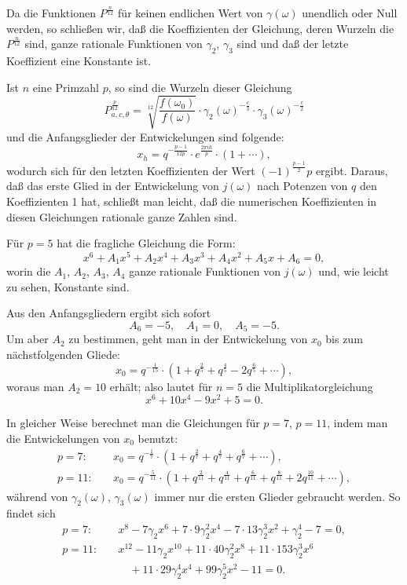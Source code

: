 \documentclass[12pt,a4paper]{article}
\theoremstyle{definition}
\begin{document}
Da die Funktionen $P^{\frac{n}{12}}$ für keinen endlichen Wert von $\gamma(\omega)$ unendlich oder Null werden, so schließen wir, daß die Koeffizienten der Gleichung, deren Wurzeln die $P^{\frac{n}{12}}$ sind, ganze rationale Funktionen von $\gamma_2$, $\gamma_3$ sind und daß der letzte Koeffizient eine Konstante ist.

Ist $n$ eine Primzahl $p$, so sind die Wurzeln dieser Gleichung
\[
P_{a,c,\theta}^{\frac{p}{12}} = \sqrt[12]{\frac{f(\omega_0)}{f(\omega)}} \cdot \gamma_2(\omega)^{-\frac{c}{3}} \cdot \gamma_3(\omega)^{-\frac{c}{2}}
\]
und die Anfangsglieder der Entwickelungen sind folgende:
\[
x_h = q^{-\frac{p-1}{12p}} \cdot e^{\frac{2\pi i h}{p}} \cdot (1 + \cdots),
\]
wodurch sich für den letzten Koeffizienten der Wert $(-1)^{\frac{p-1}{2}} p$ ergibt. Daraus, daß das erste Glied in der Entwickelung von $j(\omega)$ nach Potenzen von $q$ den Koeffizienten 1 hat, schließt man leicht, daß die numerischen Koeffizienten in diesen Gleichungen rationale ganze Zahlen sind.

Für $p = 5$ hat die fragliche Gleichung die Form:
\[
x^6 + A_1 x^5 + A_2 x^4 + A_3 x^3 + A_4 x^2 + A_5 x + A_6 = 0,
\]
worin die $A_1$, $A_2$, $A_3$, $A_4$ ganze rationale Funktionen von $j(\omega)$ und, wie leicht zu sehen, Konstante sind.

Aus den Anfangsgliedern ergibt sich sofort
\[
A_6 = -5, \quad A_1 = 0, \quad A_5 = -5.
\]
Um aber $A_2$ zu bestimmen, geht man in der Entwickelung von $x_0$ bis zum nächstfolgenden Gliede:
\[
x_0 = q^{-\frac{1}{15}} \cdot (1 + q^{\frac{2}{5}} + q^{\frac{4}{5}} - 2q^{\frac{6}{5}} + \cdots),
\]
woraus man $A_2 = 10$ erhält; also lautet für $n = 5$ die Multiplikatorgleichung
\begin{equation}\label{eq:72-8}
x^6 + 10x^4 - 9x^2 + 5 = 0.
\end{equation}

In gleicher Weise berechnet man die Gleichungen für $p = 7$, $p = 11$, indem man die Entwickelungen von $x_0$ benutzt:
\[
\begin{aligned}
p = 7:\quad &x_0 = q^{-\frac{1}{7}} \cdot (1 + q^{\frac{2}{7}} + q^{\frac{4}{7}} + q^{\frac{6}{7}} + \cdots), \\
p = 11:\quad &x_0 = q^{-\frac{5}{11}} \cdot (1 + q^{\frac{2}{11}} + q^{\frac{4}{11}} + q^{\frac{6}{11}} + q^{\frac{8}{11}} + 2q^{\frac{10}{11}} + \cdots),
\end{aligned}
\]
während von $\gamma_2(\omega)$, $\gamma_3(\omega)$ immer nur die ersten Glieder gebraucht werden. So findet sich
\begin{equation}\label{eq:72-9}
\begin{aligned}
p = 7:\quad &x^8 - 7\gamma_2 x^6 + 7 \cdot 9 \gamma_2^2 x^4 - 7 \cdot 13 \gamma_2^3 x^2 + \gamma_2^4 - 7 = 0, \\
p = 11:\quad &x^{12} - 11\gamma_2 x^{10} + 11 \cdot 40 \gamma_2^2 x^8 + 11 \cdot 153 \gamma_2^3 x^6 \\
&\quad + 11 \cdot 29 \gamma_2^4 x^4 + 99 \gamma_2^5 x^2 - 11 = 0.
\end{aligned}
\end{equation}
\end{document}
